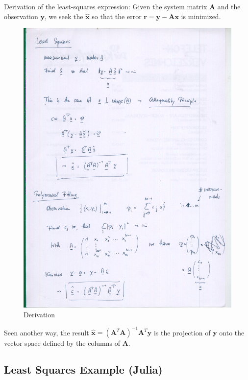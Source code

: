 

Derivation of the least-squares expression: Given the system matrix \(\mathbf{A}\) and the observation \(\mathbf{y}\), we seek the \(\mathbf{\hat{x}}\) so that the error \(\mathbf{r} = \mathbf{y} - \mathbf{A} \mathbf{x}\) is minimized.


\begin{figure}[htb!]
\centering
\includegraphics[scale=0.5]{images/least_squares.png}
\caption{Derivation}
\end{figure}

Seen another way, the result \(\mathbf{\hat{x}} = (\mathbf{A}^T \mathbf{A})^{-1} \mathbf{A}^T \mathbf{y}\) is the projection of \(\mathbf{y}\) onto the vector space defined by the columns of \(\mathbf{A}\).

\subsection{Least Squares Example (Julia)}

